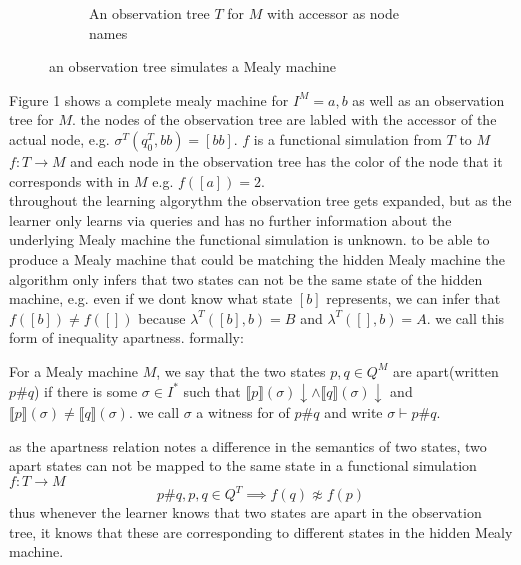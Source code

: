\begin{figure}[t]
\begin{subfigure}[b]{0.50\textwidth}
\begin{tikzpicture}[remember picture, row sep=2.5em, 		roundnode/.style={circle, draw=black, very thick, minimum size=7mm},  
		every path/.style={line width=1pt},
		every arrow/.style={scale=1.5}]
		
\end{tikzpicture}
	\caption{An observation tree $T$ for $M$ with accessor as node names}
	\label{otree:otree}
\end{subfigure}
\caption{an observation tree simulates a Mealy machine}
\label{otree}
\end{figure}
Figure 1 shows a complete mealy machine for $I^M={a,b}$ as well as an observation tree for $M$. the nodes of the observation tree are labled with the accessor of the actual node, e.g. $\sigma^T(q_0^T,bb)=[bb]$. $f$ is a functional simulation from $T$ to $M$ $f:T\rightarrow M$ and each node in the observation tree has the color of the node that it corresponds with in $M$ e.g. $f([a])=2$.\\
throughout the learning algorythm the observation tree gets expanded, but as the learner only learns via queries and has no further information about the underlying Mealy machine the functional simulation is unknown. to be able to produce a Mealy machine that could be matching the hidden Mealy machine the algorithm only infers that two states can not be the same state of the hidden machine, e.g. even if we dont know what state $[b]$ represents, we can infer that $f([b])\neq f([])$ because $\lambda^T([b],b)=B$ and $\lambda^T([],b)=A$. we call this form of inequality apartness. formally:
\begin{definition}
	For a Mealy machine $M$, we say that the two states $p,q\in Q^M$ are apart(written $p\#q$) if there is some $\sigma\in I^*$ such that $\llbracket p\rrbracket(\sigma)\downarrow\land\llbracket q\rrbracket(\sigma)\downarrow$ and $\llbracket p\rrbracket(\sigma)\neq\llbracket q\rrbracket(\sigma)$. we call $\sigma$ a witness for of $p\#q$ and write $\sigma\vdash p\#q$.
\end{definition}
as the apartness relation notes a difference in the semantics of two states, two apart states can not be mapped to the same state in a functional simulation $f:T\rightarrow M$ $$
p\#q, p,q\in Q^T\implies f(q)\not\approx f(p)
$$
thus whenever the learner knows that two states are apart in the observation tree, it knows that these are corresponding to different states in the hidden Mealy machine.
